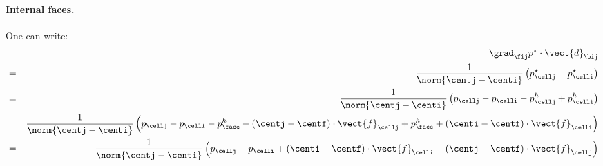 \paragraph{Internal faces.} One can write:
\begin{align*}
	&&\grad_{\fij}{p^\star}\cdot\vect{d}_{\bij} \\
	&=&\frac{1}{\norm{\centj-\centi}}\left(p_{\cellj}^\star-p_{\celli}^\star\right) \\
	&=&\frac{1}{\norm{\centj-\centi}}\left(p_{\cellj}-p_{\celli}-p_{\cellj}^{h}+p_{\celli}^{h}\right) \\
	&=&\frac{1}{\norm{\centj-\centi}}\left(p_{\cellj}-p_{\celli}-p_{\face}^{h}-\left(\centj-\centf\right)\cdot\vect{f}_{\cellj}+p_{\face}^{h}+\left(\centi-\centf\right)\cdot\vect{f}_{\celli}\right) \\
	&=&\frac{1}{\norm{\centj-\centi}}\left(p_{\cellj}-p_{\celli}+\left(\centi-\centf\right)\cdot\vect{f}_{\celli}-\left(\centj-\centf\right)\cdot\vect{f}_{\cellj}\right)
\end{align*}

